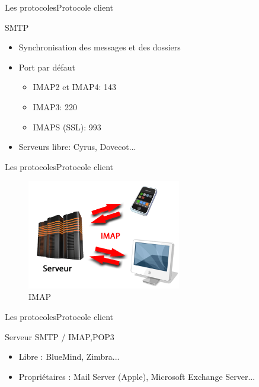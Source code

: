 \documentclass{beamer}
\begin{document}
\begin{frame}{Les protocoles}{Protocole client}
  \begin{block}{SMTP}
  \begin{itemize}
    \item<1->{
      Synchronisation des messages et des dossiers
      }
    \item<2->{
    Port par défaut \\
    \begin{itemize}
        \item IMAP2 et IMAP4: 143
        \item IMAP3: 220
        \item IMAPS (SSL): 993
    \end{itemize}
    }
    \item<3->{
     Serveurs libre: Cyrus, Dovecot...
    }
  \end{itemize}
  \end{block}
\end{frame}

\begin{frame}{Les protocoles}{Protocole client}
    \begin{figure}[H]
    \centering
    \includegraphics[width=0.6\textwidth]{imap_schem}
     \caption{IMAP}
     \label{fig:imap}
    \end{figure}
\end{frame}


\begin{frame}{Les protocoles}{Protocole client}
  \begin{block}{Serveur SMTP / IMAP,POP3}
  \begin{itemize}
    \item<1->{
    Libre : BlueMind, Zimbra...
    }
    \item<2->{
     Propriétaires : Mail Server (Apple), Microsoft Exchange Server...
    }
  \end{itemize}
  \end{block}
\end{frame}
\end{document}
